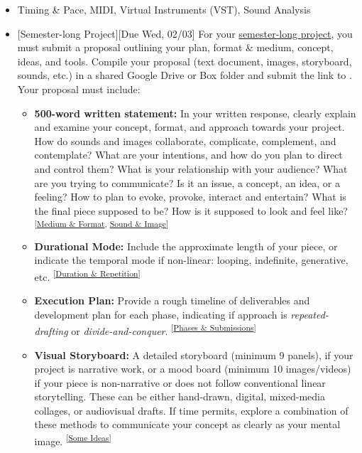 \def\dMon{Mon, 02/01}
\def\dTues{Tues, 02/02}
\def\dWed{Wed, 02/03}
\def\dThur{Thur, 02/04}
\def\dFri{Fri, 02/05}
\def\dSat{Sat, 02/06}
\def\dSun{Sun, 02/07}
\placeDate


\begin{itemize}[noitemsep,topsep=0pt,leftmargin=*]
	\item {} Timing \& Pace, MIDI, Virtual Instruments (VST), Sound Analysis
	\item {}[Semester-long Project][Due \dWed] \newline
	      For your \hyperlink{longproject}{semester-long project}, you must submit a proposal outlining your plan, format \& medium, concept, ideas, and tools. Compile your proposal (text document, images, storyboard, sounds, etc.) in a shared Google Drive or Box folder and submit the link to . Your proposal must include:
	      \begin{itemize}
		      \item \textbf{500-word written statement:} In your written response, clearly explain and examine your concept, format, and approach towards your project. How do sounds and images collaborate, complicate, complement, and contemplate? What are your intentions, and how do you plan to direct and control them? What is your relationship with your audience? What are you trying to communicate? Is it an issue, a concept, an idea, or a feeling? How to plan to evoke, provoke, interact and entertain? What is the final piece supposed to be? How is it supposed to look and feel like? \textsuperscript{[\hyperlink{projformat}{Medium \& Format}, \hyperlink{projstyle}{Sound \& Image}]}
		      \item \textbf{Durational Mode:} Include the approximate length of your piece, or indicate the temporal mode if non-linear: looping, indefinite, generative, etc. \textsuperscript{[\hyperlink{projduration}{Duration \& Repetition}]}
		      \item \textbf{Execution Plan:} Provide a rough timeline of deliverables and development plan for each phase, indicating if approach is \emph{repeated-drafting} or \emph{divide-and-conquer}. \textsuperscript{[\hyperlink{projphase}{Phases \& Submissions}]}
		      \item \textbf{Visual Storyboard:} A detailed storyboard (minimum 9 panels), if your project is narrative work, or a mood board (minimum 10 images/videos) if your piece is non-narrative or does not follow conventional linear storytelling. These can be either hand-drawn, digital, mixed-media collages, or audiovisual drafts. If time permits, explore a combination of these methods to communicate your concept as clearly as your mental image. \textsuperscript{[\hyperlink{projideas}{Some Ideas}]}

\end{itemize}
\end{itemize}
